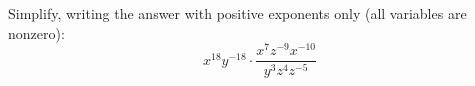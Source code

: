 Simplify, writing the answer with positive exponents only (all variables are nonzero):
\[
x^{18}y^{-18}\cdot\dfrac{x^7z^{-9}x^{-10}}{y^3z^4z^{-5}}
\]
